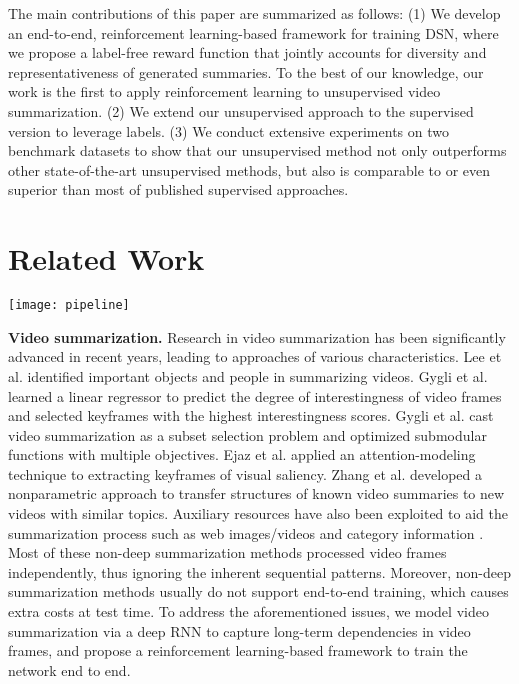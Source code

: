 \documentclass[letterpaper]{article} \usepackage{aaai18}  \usepackage{times}  \usepackage{helvet}  \usepackage{courier}  \usepackage{url}  \usepackage{graphicx}
\begin{document}
The main contributions of this paper are summarized as follows: (1) We develop an end-to-end, reinforcement learning-based framework for training DSN, where we propose a label-free reward function that jointly accounts for diversity and representativeness of generated summaries. To the best of our knowledge, our work is the first to apply reinforcement learning to unsupervised video summarization. (2) We extend our unsupervised approach to the supervised version to leverage labels. (3) We conduct extensive experiments on two benchmark datasets to show that our unsupervised method not only outperforms other state-of-the-art unsupervised methods, but also is comparable to or even superior than most of published supervised approaches.

\section{Related Work}
\begin{figure*}[h]
\centering
\texttt{[image: pipeline]}
\caption{Training deep summarization network (DSN) via reinforcement learning. DSN receives a video $\mathcal{V}_i$ and takes actions $A$ (i.e., a sequence of binary variables) on which parts of the video are selected as the summary $S$. The feedback reward $R(S)$ is computed based on the quality of the summary, i.e., diversity and representativeness.}
\label{fig:pipeline}
\end{figure*}

{\bf Video summarization.}
Research in video summarization has been significantly advanced in recent years, leading to approaches of various characteristics. Lee et al. \cite{lee2012discovering} identified important objects and people in summarizing videos. Gygli et al. \cite{gygli2014creating} learned a linear regressor to predict the degree of interestingness of video frames and selected keyframes with the highest interestingness scores. Gygli et al. \cite{gygli2015video} cast video summarization as a subset selection problem and optimized submodular functions with multiple objectives. Ejaz et al. \cite{ejaz2013efficient} applied an attention-modeling technique to extracting keyframes of visual saliency. Zhang et al. \cite{zhang2016summary} developed a nonparametric approach to transfer structures of known video summaries to new videos with similar topics. Auxiliary resources have also been exploited to aid the summarization process such as web images/videos \cite{song2015tvsum,khosla2013large,chu2015video} and category information \cite{potapov2014category}. Most of these non-deep summarization methods processed video frames independently, thus ignoring the inherent sequential patterns. Moreover, non-deep summarization methods usually do not support end-to-end training, which causes extra costs at test time. To address the aforementioned issues, we model video summarization via a deep RNN to capture long-term dependencies in video frames, and propose a reinforcement learning-based framework to train the network end to end.
\end{document}
